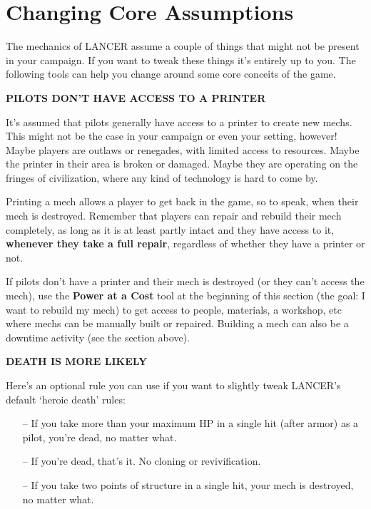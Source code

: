 \section{Changing Core Assumptions}

The mechanics of LANCER assume a couple of things that might not be present in your
campaign. If you want to tweak these things it’s entirely up to you. The following tools can help
you change around some core conceits of the game.

\begin{center}
    \textbf{PILOTS DON’T HAVE ACCESS TO A PRINTER}
\end{center}

It’s assumed that pilots generally have access to a printer to create new mechs. This might not
be the case in your campaign or even your setting, however! Maybe players are outlaws or
renegades, with limited access to resources. Maybe the printer in their area is broken or
damaged. Maybe they are operating on the fringes of civilization, where any kind of technology is
hard to come by.

Printing a mech allows a player to get back in the game, so to speak, when their mech is
destroyed. Remember that players can repair and rebuild their mech completely, as long as it is
at least partly intact and they have access to it, \textbf{whenever they take a full repair}, regardless of
whether they have a printer or not.

If pilots don’t have a printer and their mech is destroyed (or they can’t access the mech), use the
\textbf{Power at a Cost} tool at the beginning of this section (the goal: I want to rebuild my mech) to get
access to people, materials, a workshop, etc where mechs can be manually built or repaired.
Building a mech can also be a downtime activity (see the section above).


\begin{center}
    \textbf{DEATH IS MORE LIKELY}
\end{center}

Here’s an optional rule you can use if you want to slightly tweak LANCER’s default ‘heroic death’
rules:

\begin{itemize}
    \item[--]If you take more than your maximum HP in a single hit (after armor) as a pilot, you’re dead, no matter what.
    \item[--]If you’re dead, that’s it. No cloning or revivification.
    \item[--] If you take two points of structure in a single hit, your mech is destroyed, no matter what.
\end{itemize}
 
